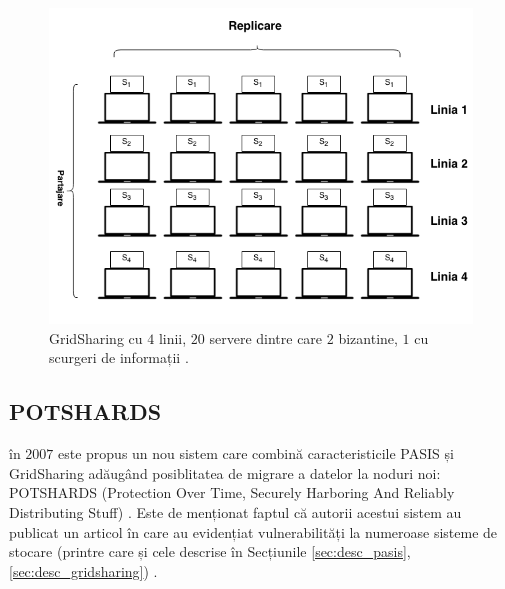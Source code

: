 \documentclass[oneside, 12pt]{book}
\begin{document}
\begin{figure}[H]
	\includegraphics[width=12cm]{img/GridSharing.png}    %
	\caption{GridSharing cu $4$ linii, $20$ servere dintre care $2$ bizantine, $1$ cu scurgeri de informații \cite{SBM:2005}.}
	\label{fig:grid_sharing}
	\bigskip
\end{figure}



\subsection{POTSHARDS} 
\label{sec:desc_potshards}
în $2007$ este propus un nou sistem care combină caracteristicile PASIS și GridSharing adăugând posiblitatea de migrare a datelor la noduri noi: POTSHARDS (Protection Over Time, Securely Harboring And Reliably Distributing Stuff) \cite{SGMV:2009}.
Este de menționat faptul că autorii acestui sistem au publicat un articol în care au evidențiat vulnerabilități la numeroase sisteme de stocare (printre care și cele descrise în Secțiunile \ref{sec:desc_pasis}, \ref{sec:desc_gridsharing}) \cite{storer:2006long}.
\end{document}
